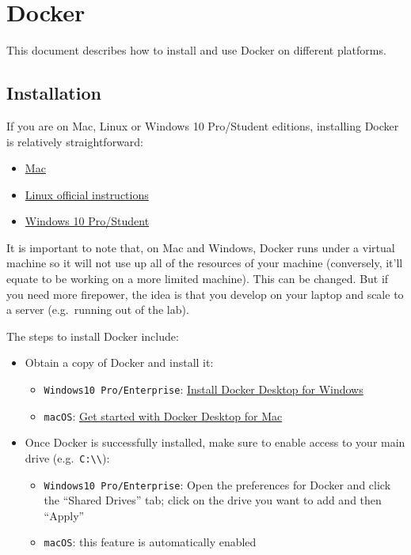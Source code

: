 \documentclass[
]{book}
\providecommand{\tightlist}{%
  \setlength{\itemsep}{0pt}\setlength{\parskip}{0pt}}
\begin{document}
\hypertarget{docker}{%
\chapter{Docker}\label{docker}}

This document describes how to install and use Docker on different platforms.

\hypertarget{installation}{%
\section{Installation}\label{installation}}

If you are on Mac, Linux or Windows 10 Pro/Student editions, installing Docker
is relatively straightforward:

\begin{itemize}
\tightlist
\item
  \href{https://docs.docker.com/docker-for-mac/}{Mac}
\item
  \href{https://docs.docker.com/install/linux/docker-ce/ubuntu/}{Linux official instructions}
\item
  \href{https://docs.docker.com/docker-for-windows/}{Windows 10 Pro/Student}
\end{itemize}

It is important to note that, on Mac and Windows, Docker runs under a virtual
machine so it will not use up all of the resources of your machine
(conversely, it'll equate to be working on a more limited machine). This can
be changed. But if you need more firepower, the idea is that you develop on
your laptop and scale to a server (e.g.~running out of the lab).

The steps to install Docker include:

\begin{itemize}
\tightlist
\item
  Obtain a copy of Docker and install it:

  \begin{itemize}
  \tightlist
  \item
    \texttt{Windows10\ Pro/Enterprise}: \href{https://docs.docker.com/docker-for-windows/install/}{Install Docker Desktop for Windows}
  \item
    \texttt{macOS}: \href{https://docs.docker.com/docker-for-mac/}{Get started with Docker Desktop for Mac}
  \end{itemize}
\item
  Once Docker is successfully installed, make sure to enable access to your main drive (e.g.~\texttt{C:\textbackslash{}\textbackslash{}}):

  \begin{itemize}
  \tightlist
  \item
    \texttt{Windows10\ Pro/Enterprise}: Open the preferences for Docker and click the
    ``Shared Drives'' tab; click on the drive you want to add and then ``Apply''
  \item
    \texttt{macOS}: this feature is automatically enabled
  \end{itemize}
\end{itemize}
\end{document}
